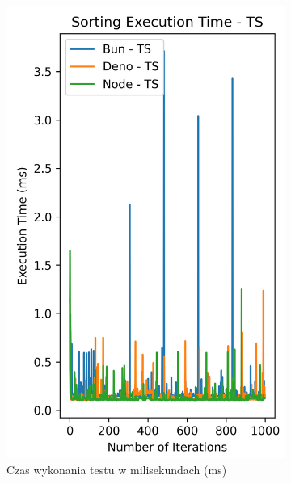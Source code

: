 \begin{figure}[H]
  \centering
  \begin{subfigure}[b]{0.4\textwidth}
    \centering
    \includegraphics[width=\textwidth]{Figures/sorting/sorting_radix_1000_1000_ts_time.png}
    \caption{Czas wykonania testu w milisekundach (ms)}
    \label{fig:radix_sorting_e2_ts_time}
  \end{subfigure}
  \begin{subfigure}[b]{0.4\textwidth}
    \centering

\end{subfigure}
\end{figure}
